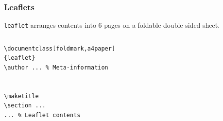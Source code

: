 \begin{frame}[fragile]
\frametitle{Leaflets}

\texttt{leaflet} arranges contents into 6 pages on a foldable double-sided sheet.

\begin{columns}
\begin{column}{.496\textwidth}
\begin{beamerboxesrounded}[width=\linewidth]{}
\begin{lstlisting}[basicstyle=\ttfamily\small,lineskip=-2pt,emph={leaflet},moretexcs={maketitle}]
\documentclass[foldmark,a4paper]
{leaflet}
\author ... % Meta-information


\maketitle
\section ...
... % Leaflet contents

\end{lstlisting}
\end{beamerboxesrounded}
\end{column}
\begin{column}{.48\textwidth}
\centering
\par
\end{column}
\end{columns}


\end{frame}
